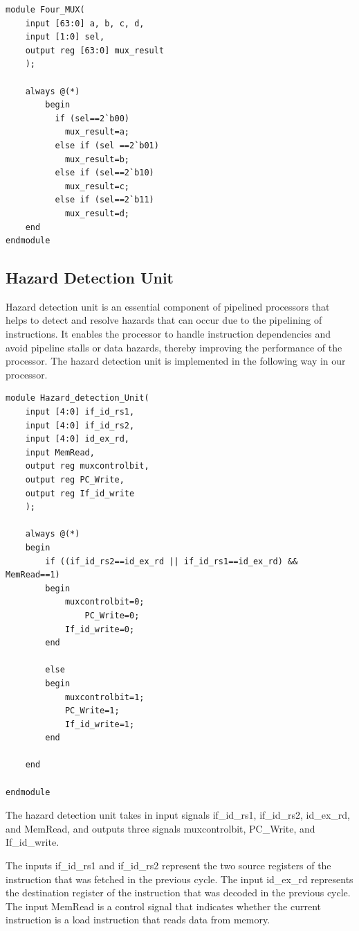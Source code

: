 \documentclass{article}
\begin{document}
\begin{lstlisting}[caption={Four MUX}, captionpos=b, language=RISC-V]
module Four_MUX(
    input [63:0] a, b, c, d, 
    input [1:0] sel, 
    output reg [63:0] mux_result
    );
    
    always @(*)
        begin
          if (sel==2`b00)
            mux_result=a;
          else if (sel ==2`b01)
            mux_result=b;
          else if (sel==2`b10)
            mux_result=c;
          else if (sel==2`b11)
            mux_result=d;    
    end 
endmodule
\end{lstlisting}
    
\subsection{Hazard Detection Unit}
Hazard detection unit is an essential component of pipelined processors that helps to detect and resolve hazards that can occur due to the pipelining of instructions. It enables the processor to handle instruction dependencies and avoid pipeline stalls or data hazards, thereby improving the performance of the processor. The hazard detection unit is implemented in the following way in our processor.

\begin{lstlisting}[caption={Hazard Detection Unit}, captionpos=b, language=RISC-V]
module Hazard_detection_Unit(
    input [4:0] if_id_rs1,
    input [4:0] if_id_rs2,
    input [4:0] id_ex_rd,
    input MemRead,
    output reg muxcontrolbit,
    output reg PC_Write,
    output reg If_id_write
    );
    
    always @(*)    
    begin 
        if ((if_id_rs2==id_ex_rd || if_id_rs1==id_ex_rd) &&  MemRead==1)
        begin
            muxcontrolbit=0;
                PC_Write=0;         
            If_id_write=0;
        end
        
        else 
        begin
            muxcontrolbit=1;
            PC_Write=1;
            If_id_write=1;
        end 
        
    end 
    
endmodule
\end{lstlisting}

The hazard detection unit takes in input signals if\_id\_rs1, if\_id\_rs2, id\_ex\_rd, and MemRead, and outputs three signals muxcontrolbit, PC\_Write, and If\_id\_write.

The inputs if\_id\_rs1 and if\_id\_rs2 represent the two source registers of the instruction that was fetched in the previous cycle. The input id\_ex\_rd represents the destination register of the instruction that was decoded in the previous cycle. The input MemRead is a control signal that indicates whether the current instruction is a load instruction that reads data from memory.
\end{document}
